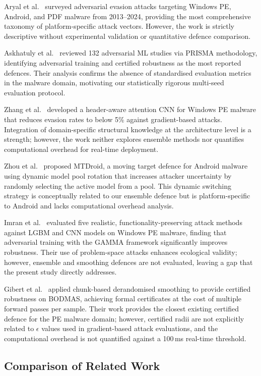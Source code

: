 \documentclass[conference]{IEEEtran}
\begin{document}
Aryal et al.\ \cite{aryal2025} surveyed adversarial evasion attacks targeting Windows PE, Android, and PDF malware from 2013--2024, providing the most comprehensive taxonomy of platform-specific attack vectors. However, the work is strictly descriptive without experimental validation or quantitative defence comparison.

Askhatuly et al.\ \cite{askhatuly2025} reviewed 132 adversarial ML studies via PRISMA methodology, identifying adversarial training and certified robustness as the most reported defences. Their analysis confirms the absence of standardised evaluation metrics in the malware domain, motivating our statistically rigorous multi-seed evaluation protocol.

Zhang et al.\ \cite{zhang2024} developed a header-aware attention CNN for Windows PE malware that reduces evasion rates to below 5\% against gradient-based attacks. Integration of domain-specific structural knowledge at the architecture level is a strength; however, the work neither explores ensemble methods nor quantifies computational overhead for real-time deployment.

Zhou et al.\ \cite{zhou2024} proposed MTDroid, a moving target defence for Android malware using dynamic model pool rotation that increases attacker uncertainty by randomly selecting the active model from a pool. This dynamic switching strategy is conceptually related to our ensemble defence but is platform-specific to Android and lacks computational overhead analysis.

Imran et al.\ \cite{imran2024} evaluated five realistic, functionality-preserving attack methods against LGBM and CNN models on Windows PE malware, finding that adversarial training with the GAMMA framework significantly improves robustness. Their use of problem-space attacks enhances ecological validity; however, ensemble and smoothing defences are not evaluated, leaving a gap that the present study directly addresses.

Gibert et al.\ \cite{gibert2024} applied chunk-based derandomised smoothing to provide certified robustness on BODMAS, achieving formal certificates at the cost of multiple forward passes per sample. Their work provides the closest existing certified defence for the PE malware domain; however, certified radii are not explicitly related to $\epsilon$ values used in gradient-based attack evaluations, and the computational overhead is not quantified against a 100\,ms real-time threshold.

\subsection{Comparison of Related Work}
\end{document}
